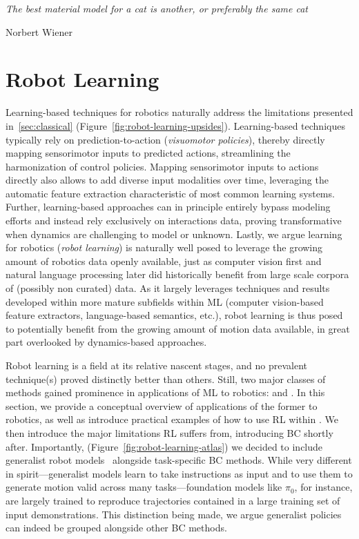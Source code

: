 \epigraph{\textit{The best material model for a cat is another, or preferably the same cat}}{Norbert Wiener}

\section{Robot Learning}
\label{sec:learning}

Learning-based techniques for robotics naturally address the limitations presented in~\ref{sec:classical} (Figure~\ref{fig:robot-learning-upsides}).
Learning-based techniques typically rely on prediction-to-action (\emph{visuomotor policies}), thereby directly mapping sensorimotor inputs to predicted actions, streamlining the harmonization of control policies.
Mapping sensorimotor inputs to actions directly also allows to add diverse input modalities over time, leveraging the automatic feature extraction characteristic of most common learning systems.
Further, learning-based approaches can in principle entirely bypass modeling efforts and instead rely exclusively on interactions data, proving transformative when dynamics are challenging to model or unknown.
Lastly, we argue learning for robotics (\emph{robot learning}) is naturally well posed to leverage the growing amount of robotics data openly available, just as computer vision first and natural language processing later did historically benefit from large scale corpora of (possibly non curated) data.
As it largely leverages techniques and results developed within more mature subfields within ML (computer vision-based feature extractors, language-based semantics, etc.), robot learning is thus posed to potentially benefit from the growing amount of motion data available, in great part overlooked by dynamics-based approaches.

Robot learning is a field at its relative nascent stages, and no prevalent technique(s) proved distinctly better than others.
Still, two major classes of methods gained prominence in applications of ML to robotics:  and .
In this section, we provide a conceptual overview of applications of the former to robotics, as well as introduce practical examples of how to use RL within \lerobot.
We then introduce the major limitations RL suffers from, introducing BC shortly after.
Importantly, (Figure~\ref{fig:robot-learning-atlas}) we decided to include generalist robot models~\citep{blackpi0VisionLanguageActionFlow2024,shukorSmolVLAVisionLanguageActionModel2025} alongside task-specific BC methods.
While very different in spirit---generalist models learn to take instructions as input and to use them to generate motion valid across many tasks---foundation models like \( \pi_0 \), for instance, are largely trained to reproduce trajectories contained in a large training set of input demonstrations.
This distinction being made, we argue generalist policies can indeed be grouped alongside other BC methods.

